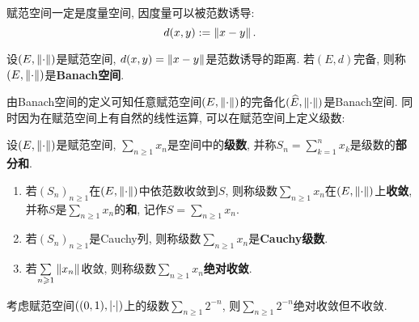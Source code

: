 	\begin{Remark}
	赋范空间一定是度量空间, 因度量可以被范数诱导:
	\[
	d(x,y):=\left\| x-y \right\|.
	\]
	\end{Remark}

	\begin{Definition}[Banach空间]\label{def:Banach空间}
	设$ (E,\left\| \cdot \right\|) $是赋范空间, $ d(x,y)=\left\| x-y \right\| $是范数诱导的距离. 若$ (E,d) $完备, 则称$ (E,\left\| \cdot \right\|) $是\textbf{Banach空间}.
	\end{Definition}

	由Banach空间的定义可知任意赋范空间$ (E,\left\| \cdot \right\|) $的完备化$ (\widehat{E},\left\| \cdot \right\|) $是Banach空间. 同时因为在赋范空间上有自然的线性运算, 可以在赋范空间上定义级数:

	\begin{Definition}[级数]\label{def:级数}
	设$ (E,\left\| \cdot \right\|) $是赋范空间, $ \sum\limits_{n\geqslant 1}x_n $是空间中的\textbf{级数}, 并称$ S_n=\sum\limits_{k=1}^nx_k $是级数的\textbf{部分和}.

	\begin{enumerate}[(1)]
	\item 若$ (S_n)_{n\geqslant 1} $在$ (E,\left\| \cdot \right\|) $中依范数收敛到$ S $, 则称级数$ \sum\limits_{n\geqslant 1}x_n $在$ (E,\left\| \cdot \right\|) $上\textbf{收敛}, 并称$ S $是$ \sum\limits_{n\geqslant 1}x_n $的\textbf{和}, 记作$ S=\sum\limits_{n\geqslant 1}x_n $.

	\item 若$ (S_n)_{n\geqslant 1} $是Cauchy列, 则称级数$ \sum\limits_{n\geqslant 1}x_n $是\textbf{Cauchy级数}.

	\item 若$ \sum\limits_{n\geqslant 1}\left\| x_n \right\| $收敛, 则称级数$ \sum\limits_{n\geqslant 1}x_n $\textbf{绝对收敛}.
	\end{enumerate}
	\end{Definition}

	\begin{Remark}
	考虑赋范空间$ ((0,1),\left| \cdot \right| ) $上的级数$ \sum\limits_{n\geqslant 1}2^{-n} $, 则$ \sum\limits_{n\geqslant 1}2^{-n} $绝对收敛但不收敛.
	\end{Remark}

